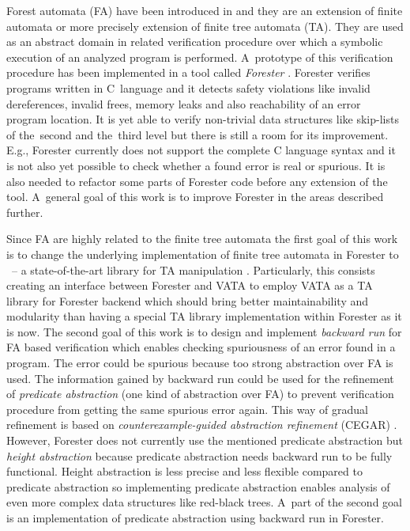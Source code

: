 \documentclass[fleqn,11pt]{ExcelAtFIT} %
\begin{document}
Forest automata (FA) have been introduced in \cite{forester11,forester12} and they are an extension of finite automata or more precisely extension of finite tree automata (TA).
They are used as an abstract domain in related verification procedure over which a symbolic execution of an analyzed program is performed.
A~prototype of this verification procedure has been implemented in a tool called \emph{Forester} \cite{www:forester}.
Forester verifies programs written in C~language and it detects safety violations like invalid dereferences, invalid frees,
memory leaks and also reachability of an error program location.
It is yet able to verify non-trivial data structures like skip-lists of the~second and the~third level
but there is still a room for its improvement.
E.g., Forester currently does not support the complete C language syntax and %
it is not also yet possible to check whether a found error is real or spurious.
It is also needed to refactor some parts of Forester code before any extension of the tool.
A~general goal of this work is to improve Forester in the areas described further.

Since FA are highly related to the finite tree automata the first goal of this work is to change
the underlying implementation of finite tree automata in Forester to \vata\ -- a state-of-the-art library for TA manipulation \cite{libvata}.
Particularly, this consists creating an interface between Forester and VATA to employ VATA as a TA library for Forester backend
which should bring better maintainability and modularity than having a special TA library implementation within Forester as it is now.
The second goal of this work is to design and implement \emph{backward run} for FA based verification
which enables checking spuriousness of an error found in a program.
The error could be spurious because too strong abstraction over FA is used.
The information gained by backward run could be used for the refinement of \emph{predicate abstraction} (one kind of abstraction over FA)
to prevent verification procedure from getting the same spurious error again.
This way of gradual refinement is based on \emph{counterexample-guided abstraction refinement} (CEGAR) \cite{cegar}.
However, Forester does not currently use the mentioned predicate abstraction but \emph{height abstraction} %
because predicate abstraction needs backward run to be fully functional.
Height abstraction is less precise and less flexible compared to predicate abstraction so implementing predicate abstraction
enables analysis of even more complex data structures like red-black trees.
A~part of the second goal is an implementation of predicate abstraction using backward run in Forester.
\end{document}
